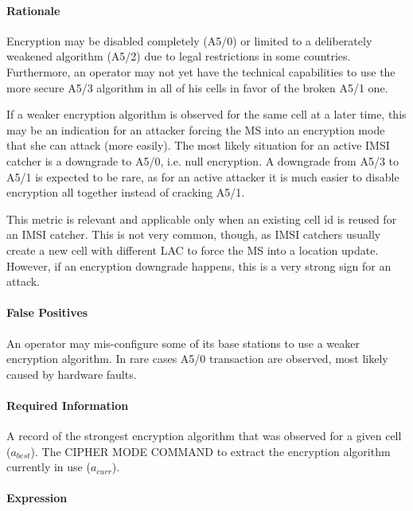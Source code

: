 \documentclass[a4paper,11pt,notitlepage,bigheadings,oneside]{scrartcl}
\begin{document}
\paragraph{Rationale}

Encryption may be disabled completely (A5/0) or limited to a deliberately
weakened algorithm (A5/2) due to legal restrictions in some countries.
Furthermore, an operator may not yet have the technical capabilities to use the
more secure A5/3 algorithm in all of his cells in favor of the broken A5/1 one.

If a weaker encryption algorithm is observed for the same cell at a later time,
this may be an indication for an attacker forcing the MS into an encryption
mode that she can attack (more easily). The most likely situation for an active
IMSI catcher is a downgrade to A5/0, i.e. null encryption. A downgrade from
A5/3 to A5/1 is expected to be rare, as for an active attacker it is much
easier to disable encryption all together instead of cracking A5/1.

This metric is relevant and applicable only when an existing cell id is reused
for an IMSI catcher. This is not very common, though, as IMSI catchers usually
create a new cell with different LAC to force the MS into a location update.
However, if an encryption downgrade happens, this is a very strong sign for an
attack.

\paragraph{False Positives}

An operator may mis-configure some of its base stations to use a weaker
encryption algorithm. In rare cases A5/0 transaction are observed, most likely
caused by hardware faults.


\paragraph{Required Information}

A record of the strongest encryption algorithm that was observed for a given
cell ($a_{best}$). The CIPHER MODE COMMAND to extract the encryption algorithm
currently in use ($a_{curr}$).

\paragraph{Expression}
\end{document}
